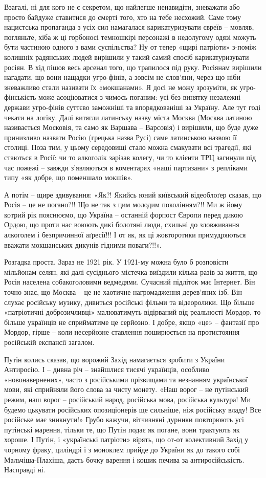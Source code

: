 Взагалі, ні для кого не є секретом, що найлегше ненавидіти, зневажати або
просто байдуже ставитися до смерті того, хто на тебе несхожий. Саме тому
нацистська пропаганда з усіх сил намагалася карикатуризувати євреїв – мовляв,
погляньте, хіба ж ці горбоносі темношкірі персонажі в недолугому одязі можуть
бути частиною одного з вами суспільства? Ну от тепер «щирі патріоти» з-поміж
колишніх радянських людей вирішили у такий самий спосіб карикатуризувати
росіян. В хід пішов весь арсенал того, що трапилося під руку. Росіянам вирішили
нагадати, що вони нащадки угро-фінів, а зовсім не слов'яни, через що ніби
зневажливо стали називати їх «мокшанами». Я досі не можу зрозуміти, як
угро-фінськість може асоціюватися з чимось поганим: усі без винятку незалежні
держави угро-фінів суттєво заможніші та впорядкованіші за Україну. Але тут годі
чекати на логіку. Далі витягли латинську назву міста Москва (Москва латиною
називається Московія, та само як Варшава – Варсовія) і вирішили, що буде дуже
принизливо назвати Росію (грецька назва Русі) саме латинською назвою її
столиці. Поза тим, у цьому середовищі стало можна смакувати всі трагедії, які
стаються в Росії: чи то алкоголік зарізав колегу, чи то клієнти ТРЦ загинули
під час пожежі – завжди з'являються в коментарях «наші партизани» з репліками
типу «як добре, що поменшало мокшів».

А потім – щире здивування: «Як?! Якийсь юний київський відеоблоґер сказав, що
Росія – це не погано?!! Що не так з цим молодим поколінням?!! Ми ж йому котрий
рік пояснюємо, що Україна – останній форпост Європи перед дикою Ордою, що проти
нас воюють дикі болотяні люди, схильні до зловживання алкоголем і безпричинної
аґресії!!! І от як, як ці жовторотики примудряються вважати мокшанських дикунів
гідними поваги?!!».

Розгадка проста. Зараз не 1921 рік. У 1921-му можна було б розповісти мільйонам
селян, які далі сусіднього містечка виїздили кілька разів за життя, що Росія
населена собакоголовими ведмедями. Сучасний підліток має Інтернет. Він точно
знає, що Москва – це не хаотичне нагромадження дерев'яних ізб. Він слухає
російську музику, дивиться російські фільми та відеоролики. Що більше
«патріотичні доброзичливці» малюватимуть відірваний від реальності Мордор, то
більше українців не сприйматиме це серйозно. І добре, якщо «це» – фантазії про
Мордор, гірше – коли несерйозне ставлення поширюється на протистояння
російській експансії загалом.

Путін колись сказав, що ворожий Захід намагається зробити з України Антиросію.
І – дивна річ – знайшлися тисячі українців, особливо «новонавернених», часто з
російськими прізвищами та незнанням української мови, які сприйняли його слова
за чисту монету. «Наш ворог – не путінський режим, наш ворог – російський
народ, російська мова, російська культура! Ми будемо цькувати російських
опозиціонерів ще сильніше, ніж російську владу! Все російське має зникнути!»
Грубо кажучи, вітчизняні дурники повторюють усі путінські марення, тільки те,
що Путін подає як погане, вони трактують як хороше. І Путін, і «українські
патріоти» вірять, що от-от колективний Захід у чорному фраку, циліндрі і з
моноклем прийде до України як до такого собі Мальчіша-Плахіша, дасть бочку
варення і кошик печива за антиросійськість. Насправді ні.

